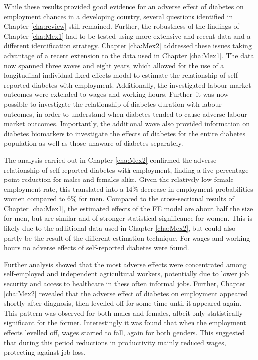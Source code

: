 While these results provided good evidence for an adverse effect of diabetes on employment chances in a developing country, several questions identified in Chapter \ref{cha:review} still remained. Further, the robustness of the findings of Chapter \ref{cha:Mex1} had to be tested using more extensive and recent data and a different identification strategy. Chapter \ref{cha:Mex2} addressed these issues taking advantage of a recent extension to the data used in Chapter \ref{cha:Mex1}. The data now spanned three waves and eight years, which allowed for the use of a longitudinal individual fixed effects model to estimate the relationship of self-reported diabetes with employment. Additionally, the investigated labour market outcomes were extended to wages and working hours. Further, it was now possible to investigate the relationship of diabetes duration with labour outcomes, in order to understand when diabetes tended to cause adverse labour market outcomes. Importantly, the additional wave also provided information on diabetes biomarkers to investigate the effects of diabetes for the entire diabetes population as well as those unaware of diabetes separately.

The analysis carried out in Chapter \ref{cha:Mex2} confirmed the adverse relationship of self-reported diabetes with employment, finding a five percentage point reduction for males and females alike. Given the relatively low female employment rate, this translated into a 14\% decrease in employment probabilities women compared to 6\% for men. Compared to the cross-sectional results of Chapter \ref{cha:Mex1}, the estimated effects of the \ac{FE} model are about half the size for men, but are similar and of stronger statistical significance for women. This is likely due to the additional data used in Chapter \ref{cha:Mex2}, but could also partly be the result of the different estimation technique. For wages and working hours no adverse effects of self-reported diabetes were found.

Further analysis showed that the most adverse effects were concentrated among self-employed and independent agricultural workers, potentially due to lower job security and access to healthcare in these often informal jobs. Further, Chapter \ref{cha:Mex2} revealed that the adverse effect of diabetes on employment appeared shortly after diagnosis, then levelled off for some time until it appeared again. This pattern was observed for both males and females, albeit only statistically significant for the former. Interestingly it was found that when the employment effects levelled off, wages started to fall, again for both genders. This suggested that during this period reductions in productivity mainly reduced wages, protecting against job loss.

